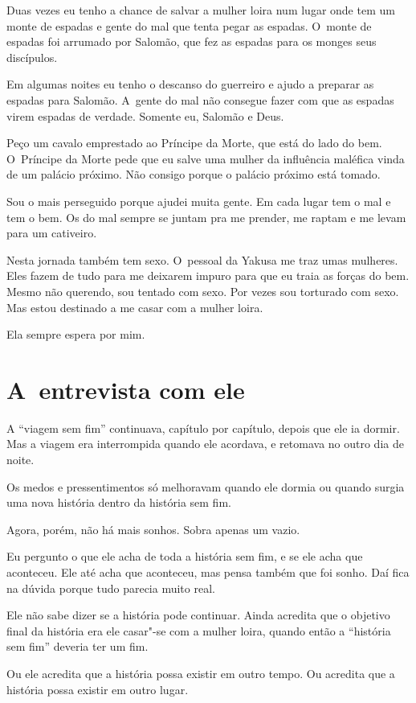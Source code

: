 Duas vezes eu tenho a chance de salvar a mulher loira num lugar onde tem
um monte de espadas e gente do mal que tenta pegar as espadas. O~monte
de espadas foi arrumado por Salomão, que fez as espadas para os monges
seus discípulos.

Em algumas noites eu tenho o descanso do guerreiro e ajudo a preparar as
espadas para Salomão. A~gente do mal não consegue fazer com que as
espadas virem espadas de verdade. Somente eu, Salomão e Deus.

Peço um cavalo emprestado ao Príncipe da Morte, que está do lado do bem.
O~Príncipe da Morte pede que eu salve uma mulher da influência maléfica
vinda de um palácio próximo. Não consigo porque o palácio próximo está
tomado.

Sou o mais perseguido porque ajudei muita gente. Em cada lugar tem o mal
e tem o bem. Os do mal sempre se juntam pra me prender, me raptam e me
levam para um cativeiro.

Nesta jornada também tem sexo. O~pessoal da Yakusa me traz umas
mulheres. Eles fazem de tudo para me deixarem impuro para que eu traia
as forças do bem. Mesmo não querendo, sou tentado com sexo. Por vezes
sou torturado com sexo. Mas estou destinado a me casar com a mulher
loira.

Ela sempre espera por mim.

\section{A~entrevista com ele}

A ``viagem sem fim'' continuava, capítulo por capítulo, depois que ele
ia dormir. Mas a viagem era interrompida quando ele acordava, e retomava
no outro dia de noite.

Os medos e pressentimentos só melhoravam quando ele dormia ou quando
surgia uma nova história dentro da história sem fim.

Agora, porém, não há mais sonhos. Sobra apenas um vazio.

Eu pergunto o que ele acha de toda a história sem fim, e se ele acha que
aconteceu. Ele até acha que aconteceu, mas pensa também que foi sonho.
Daí fica na dúvida porque tudo parecia muito real.

Ele não sabe dizer se a história pode continuar. Ainda acredita que o
objetivo final da história era ele casar"-se com a mulher loira, quando
então a ``história sem fim'' deveria ter um fim.

Ou ele acredita que a história possa existir em outro tempo. Ou acredita
que a história possa existir em outro lugar.

